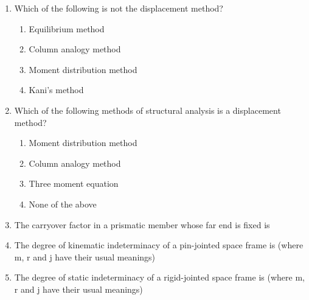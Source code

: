 \documentclass[11pt,a4paper]{article}
\begin{document}
\begin{enumerate}
\item{Which of the following is not the displacement method?}
\begin{enumerate}[label=\Alph*.]
\item{Equilibrium method}
\item{Column analogy method}
\item{Moment distribution method}
\item{Kani's method}
\end{enumerate}
\item{Which of the following methods of structural analysis is a displacement method?}
\begin{enumerate}[label=\Alph*.]
\item{Moment distribution method}
\item{Column analogy method}
\item{Three moment equation}
\item{None of the above}
\end{enumerate}
\item{The carryover factor in a prismatic member whose far end is fixed is}
\\
\item{The degree of kinematic indeterminacy of a pin-jointed space frame is (where m, r and j have their usual meanings)}
\\
\item{The degree of static indeterminacy of a rigid-jointed space frame is (where m, r and j have their usual meanings)}
\\\begin{enumerate*}[itemjoin=\qquad, label=\Alph*.]

\end{enumerate*}
\end{enumerate}
\end{document}
